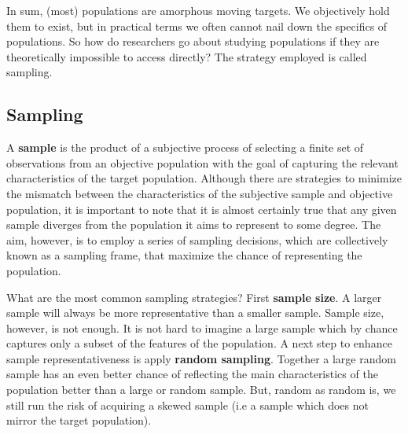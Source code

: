 \documentclass[
  letterpaper,
]{scrbook}
\begin{document}
In sum, (most) populations are amorphous moving targets. We objectively
hold them to exist, but in practical terms we often cannot nail down the
specifics of populations. So how do researchers go about studying
populations if they are theoretically impossible to access directly? The
strategy employed is called sampling.

\hypertarget{sampling}{%
\subsection{Sampling}\label{sampling}}

A \textbf{sample} is the product of a subjective process
of selecting a finite set of observations from an objective population
with the goal of capturing the relevant characteristics of the target
population. Although there are strategies to minimize the mismatch
between the characteristics of the subjective sample and objective
population, it is important to note that it is almost certainly true
that any given sample diverges from the population it aims to represent
to some degree. The aim, however, is to employ a series of sampling
decisions, which are collectively known as a sampling frame, that
maximize the chance of representing the population.

What are the most common sampling strategies? First
\textbf{sample size}. A larger sample will always be
more representative than a smaller sample. Sample size, however, is not
enough. It is not hard to imagine a large sample which by chance
captures only a subset of the features of the population. A next step to
enhance sample representativeness is apply \textbf{random sampling}.
Together a large random sample has an even better chance of reflecting
the main characteristics of the population better than a large or random
sample. But, random as random is, we still run the risk of acquiring a
skewed sample (i.e a sample which does not mirror the target
population).
\end{document}
